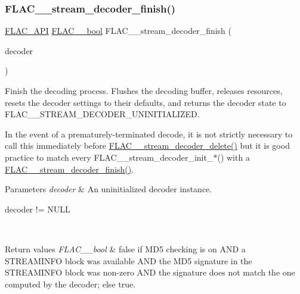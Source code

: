 \subsubsection{\texorpdfstring{F\+L\+A\+C\+\_\+\+\_\+stream\+\_\+decoder\+\_\+finish()}{FLAC\_\_stream\_decoder\_finish()}}
{\footnotesize\ttfamily \hyperlink{group__flac__export_ga56ca07df8a23310707732b1c0007d6f5}{F\+L\+A\+C\+\_\+\+A\+PI} \hyperlink{ordinals_8h_a95103469f1cbd78b8cf250194985b34e}{F\+L\+A\+C\+\_\+\+\_\+bool} F\+L\+A\+C\+\_\+\+\_\+stream\+\_\+decoder\+\_\+finish (\begin{DoxyParamCaption}\item[{\hyperlink{struct_f_l_a_c_____stream_decoder}{F\+L\+A\+C\+\_\+\+\_\+\+Stream\+Decoder} $\ast$}]{decoder }\end{DoxyParamCaption})}

Finish the decoding process. Flushes the decoding buffer, releases resources, resets the decoder settings to their defaults, and returns the decoder state to F\+L\+A\+C\+\_\+\+\_\+\+S\+T\+R\+E\+A\+M\+\_\+\+D\+E\+C\+O\+D\+E\+R\+\_\+\+U\+N\+I\+N\+I\+T\+I\+A\+L\+I\+Z\+ED.

In the event of a prematurely-\/terminated decode, it is not strictly necessary to call this immediately before \hyperlink{group__flac__stream__decoder_gab958ee28b829be37e541946676ad9677}{F\+L\+A\+C\+\_\+\+\_\+stream\+\_\+decoder\+\_\+delete()} but it is good practice to match every F\+L\+A\+C\+\_\+\+\_\+stream\+\_\+decoder\+\_\+init\+\_\+$\ast$() with a \hyperlink{group__flac__stream__decoder_gaa51bb38f762ee11b320a0839f165c5ce}{F\+L\+A\+C\+\_\+\+\_\+stream\+\_\+decoder\+\_\+finish()}.


\begin{DoxyParams}{Parameters}
{\em decoder} & An uninitialized decoder instance.  
\begin{DoxyCode}
decoder != NULL 
\end{DoxyCode}
 \\
\hline
\end{DoxyParams}

\begin{DoxyRetVals}{Return values}
{\em F\+L\+A\+C\+\_\+\+\_\+bool} & {\ttfamily false} if M\+D5 checking is on A\+ND a S\+T\+R\+E\+A\+M\+I\+N\+FO block was available A\+ND the M\+D5 signature in the S\+T\+R\+E\+A\+M\+I\+N\+FO block was non-\/zero A\+ND the signature does not match the one computed by the decoder; else {\ttfamily true}. \\
\hline
\end{DoxyRetVals}
\mbox{\label{group__flac__stream__decoder_ga0109ce87f2c648b224b68c08b3c090cb}} 
